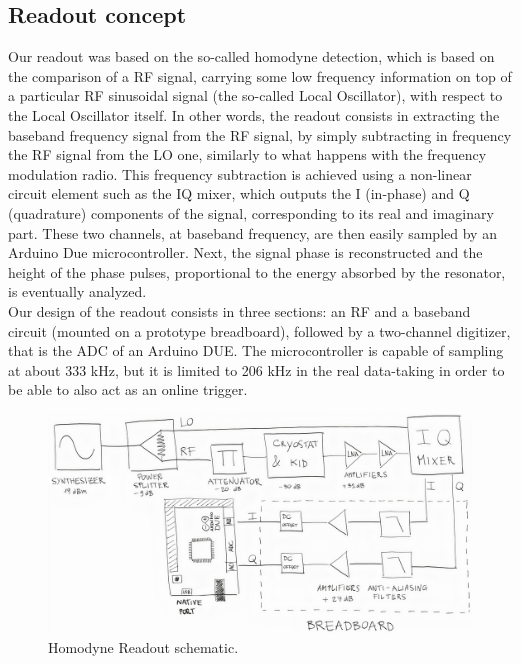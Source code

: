 \documentclass[12pt]{article}
\begin{document}
\subsection{Readout concept}
Our readout was based on the so-called homodyne detection, which is based on the comparison of a RF signal, carrying some low frequency information on top of a particular RF sinusoidal signal (the so-called Local Oscillator), with respect to the Local Oscillator itself.
In other words, the readout consists in extracting the baseband frequency signal from the RF signal, by simply subtracting in frequency the RF signal from the LO one, similarly to what happens with the frequency modulation radio. This frequency subtraction is achieved using a non-linear circuit element such as the IQ mixer, which outputs the I (in-phase) and Q (quadrature) components of the signal, corresponding to its real and imaginary part. These two channels, at baseband frequency, are then easily sampled by an Arduino Due microcontroller. Next, the signal phase is reconstructed and the height of the phase pulses, proportional to the energy absorbed by the resonator, is eventually analyzed.\\
Our design of the readout consists in three sections: an RF and a baseband circuit (mounted on a prototype breadboard), followed by a two-channel digitizer, that is the ADC of an Arduino DUE. The microcontroller is capable of sampling at about 333 kHz, but it is limited to 206 kHz in the real data-taking in order to be able to also act as an online trigger.
\begin{figure}[H]
        \centering
        \includegraphics[width=\textwidth]{schema.jpg}
        \caption{Homodyne Readout schematic.}
        \label{scheme}
    \end{figure}
\end{document}
